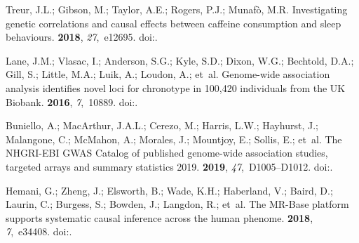 \documentclass[genes,article,accept,moreauthors,pdftex]{Definitions/mdpi}
\begin{document}
\begin{thebibliography}{999}
Treur, J.L.; Gibson, M.; Taylor, A.E.; Rogers, P.J.; Munafò, M.R.
\newblock Investigating genetic correlations and causal effects between
  caffeine consumption and sleep behaviours.
 {\bf 2018}, {\em 27},~e12695.
\newblock
  doi:{\href{https://doi.org/10.1111/jsr.12695}{}}.

Lane, J.M.; Vlasac, I.; Anderson, S.G.; Kyle, S.D.; Dixon, W.G.; Bechtold,
  D.A.; Gill, S.; Little, M.A.; Luik, A.; Loudon, A.; et~al.
\newblock Genome-wide association analysis identifies novel loci for chronotype
  in 100,420 individuals from the {UK} {Biobank}.
 {\bf 2016}, {\em 7},~10889.
\newblock
  doi:{\href{https://doi.org/10.1038/ncomms10889}{}}.

Buniello, A.; MacArthur, J.A.L.; Cerezo, M.; Harris, L.W.; Hayhurst, J.;
  Malangone, C.; McMahon, A.; Morales, J.; Mountjoy, E.; Sollis, E.; et~al.
\newblock The {NHGRI}-{EBI} {GWAS} {Catalog} of published genome-wide
  association studies, targeted arrays and summary statistics 2019.
 {\bf 2019}, {\em 47},~D1005--D1012.
\newblock
  doi:{\href{https://doi.org/10.1093/nar/gky1120}{}}.

Hemani, G.; Zheng, J.; Elsworth, B.; Wade, K.H.; Haberland, V.; Baird, D.;
  Laurin, C.; Burgess, S.; Bowden, J.; Langdon, R.; et~al.
\newblock The {MR}-{Base} platform supports systematic causal inference across
  the human phenome.
 {\bf 2018}, {\em 7},~e34408.
\newblock 
  doi:{\href{https://doi.org/10.7554/eLife.34408}{}}.


\end{thebibliography}
\end{document}
